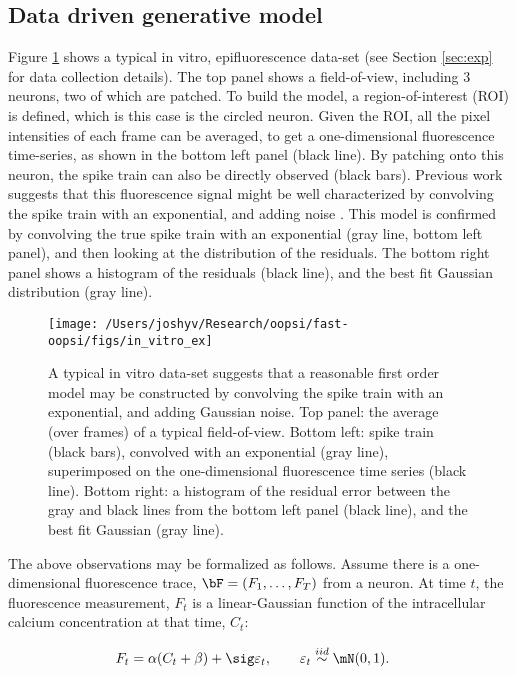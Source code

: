 \subsection{Data driven generative model} \label{sec:model}

Figure \ref{fig:in_vitro_ex} shows a typical in vitro, epifluorescence data-set (see Section \ref{sec:exp} for data collection details).  The top panel shows a field-of-view, including 3 neurons, two of which are patched.  To build the model, a region-of-interest (ROI) is defined,  which is this case is the circled neuron.  Given the ROI, all the pixel intensities of each frame can be averaged, to get a one-dimensional fluorescence time-series, as shown in the bottom left panel (black line).  By patching onto this neuron, the spike train can also be directly observed (black bars). Previous work suggests that this fluorescence signal might be well characterized by convolving the spike train with an exponential, and adding noise \cite{ImagingManual}.  This model is confirmed by convolving the true spike train with an exponential (gray line, bottom left panel), and then looking at the distribution of the residuals.  The bottom right panel shows a histogram of the residuals (black line), and the best fit Gaussian distribution (gray line).


\begin{figure}[h!]
\centering \texttt{[image: /Users/joshyv/Research/oopsi/fast-oopsi/figs/in\_vitro\_ex]}
\caption[data-based model]{A typical in vitro data-set suggests that a reasonable first order model may be constructed by convolving the spike train with an exponential, and adding Gaussian noise. Top panel: the average (over frames) of a typical field-of-view.  Bottom left: spike train (black bars), convolved with an exponential (gray line), superimposed on the one-dimensional fluorescence time series (black line).  Bottom right: a histogram of the residual error between the gray and black lines from the bottom left panel (black line), and the best fit Gaussian (gray line).} \label{fig:in_vitro_ex}
\end{figure}

The above observations may be formalized as follows. Assume there is a one-dimensional fluorescence trace, $\bF=(F_1, \ldots, F_T)$ from a neuron.  At time $t$, the fluorescence measurement, $F_t$ is a linear-Gaussian function of the intracellular calcium concentration at that time, $C_t$:

\begin{align} \label{eq:F}
F_t &= \alpha (C_t + \beta) + \sig \varepsilon_t, \qquad \varepsilon_t \overset{iid}{\sim} \mN(0,1).
\end{align}

